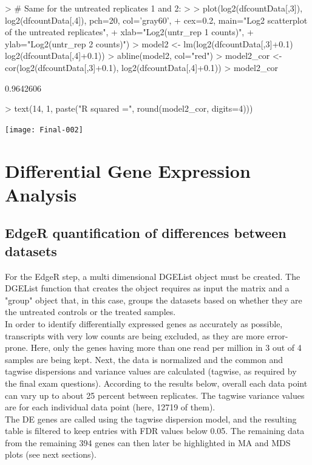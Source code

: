 \documentclass[a4paper,11pt]{article}
\begin{document}
\begin{Schunk}
\begin{Sinput}
> # Same for the untreated replicates 1 and 2:
> 
> plot(log2(dfcountData[,3]), log2(dfcountData[,4]), pch=20, col='gray60',
+      cex=0.2, main="Log2 scatterplot of the untreated replicates", 
+      xlab="Log2(untr_rep 1 counts)",
+      ylab="Log2(untr_rep 2 counts)")
> model2 <- lm(log2(dfcountData[,3]+0.1) ~ log2(dfcountData[,4]+0.1))
> abline(model2, col="red")
> model2_cor <- cor(log2(dfcountData[,3]+0.1), log2(dfcountData[,4]+0.1))
> model2_cor
\end{Sinput}
\begin{Soutput}
[1] 0.9642606
\end{Soutput}
\begin{Sinput}
> text(14, 1, paste("R squared =", round(model2_cor, digits=4)))
\end{Sinput}
\end{Schunk}
\texttt{[image: Final-002]}


\section{Differential Gene Expression Analysis}
\subsection{EdgeR quantification of differences between datasets}
For the EdgeR step, a multi dimensional DGEList object must be created. The DGEList function that creates the object requires as input the matrix and a "group" object that, in this case, groups the datasets based on whether they are the untreated controls or the treated samples.\\
In order to identify differentially expressed genes as accurately as possible, transcripts with very low counts are being excluded, as they are more error-prone. Here, only the genes having more than one read per million in 3 out of 4 samples are being kept. Next, the data is normalized and the common and tagwise dispersions and variance values are calculated (tagwise, as required by the final exam questions). According to the results below, overall each data point can vary up to about 25 percent between replicates. The tagwise variance values are for each individual data point (here, 12719 of them).\\
The DE genes are called using the tagwise dispersion model, and the resulting table is filtered to keep entries with FDR values below 0.05. The remaining data from the remaining 394 genes can then later be highlighted in MA and MDS plots (see next sections). 
\end{document}
